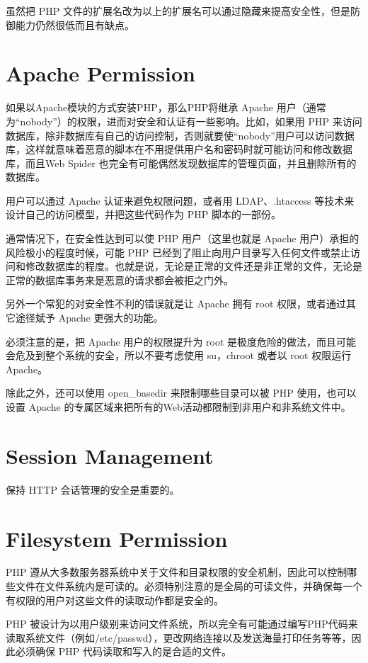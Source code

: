 虽然把 PHP 文件的扩展名改为以上的扩展名可以通过隐藏来提高安全性，但是防御能力仍然很低而且有缺点。


\section{Apache Permission}


如果以Apache模块的方式安装PHP，那么PHP将继承 Apache 用户（通常为“nobody”）的权限，进而对安全和认证有一些影响。比如，如果用 PHP 来访问数据库，除非数据库有自己的访问控制，否则就要使“nobody”用户可以访问数据库，这样就意味着恶意的脚本在不用提供用户名和密码时就可能访问和修改数据库，而且Web Spider 也完全有可能偶然发现数据库的管理页面，并且删除所有的数据库。

用户可以通过 Apache 认证来避免权限问题，或者用 LDAP、.htaccess 等技术来设计自己的访问模型，并把这些代码作为 PHP 脚本的一部份。

通常情况下，在安全性达到可以使 PHP 用户（这里也就是 Apache 用户）承担的风险极小的程度时候，可能 PHP 已经到了阻止向用户目录写入任何文件或禁止访问和修改数据库的程度。也就是说，无论是正常的文件还是非正常的文件，无论是正常的数据库事务来是恶意的请求都会被拒之门外。

另外一个常犯的对安全性不利的错误就是让 Apache 拥有 root 权限，或者通过其它途径斌予 Apache 更强大的功能。

必须注意的是，把 Apache 用户的权限提升为 root 是极度危险的做法，而且可能会危及到整个系统的安全，所以不要考虑使用 su，chroot 或者以 root 权限运行Apache。

除此之外，还可以使用 open\_basedir 来限制哪些目录可以被 PHP 使用，也可以设置 Apache 的专属区域来把所有的Web活动都限制到非用户和非系统文件中。


\section{Session Management}

保持 HTTP 会话管理的安全是重要的。


\section{Filesystem Permission}


PHP 遵从大多数服务器系统中关于文件和目录权限的安全机制，因此可以控制哪些文件在文件系统内是可读的。必须特别注意的是全局的可读文件，并确保每一个有权限的用户对这些文件的读取动作都是安全的。

PHP 被设计为以用户级别来访问文件系统，所以完全有可能通过编写PHP代码来读取系统文件（例如/etc/passwd），更改网络连接以及发送海量打印任务等等，因此必须确保 PHP 代码读取和写入的是合适的文件。

